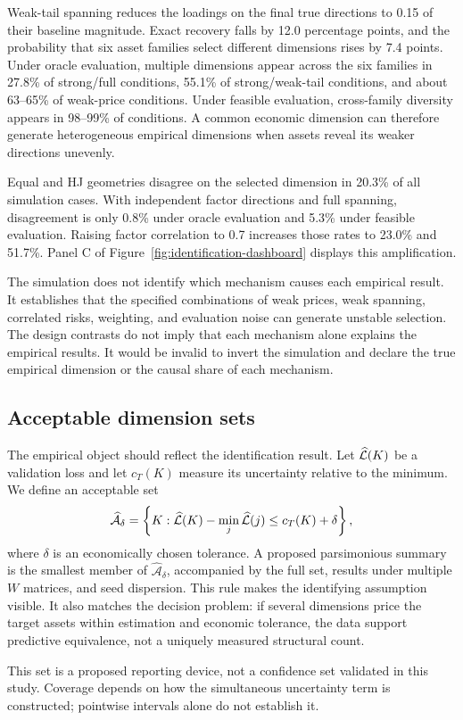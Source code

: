 Weak-tail spanning reduces the loadings on the final true directions to 0.15 of their baseline magnitude. Exact recovery falls by 12.0 percentage points, and the probability that six asset families select different dimensions rises by 7.4 points. Under oracle evaluation, multiple dimensions appear across the six families in 27.8\% of strong/full conditions, 55.1\% of strong/weak-tail conditions, and about 63--65\% of weak-price conditions. Under feasible evaluation, cross-family diversity appears in 98--99\% of conditions. A common economic dimension can therefore generate heterogeneous empirical dimensions when assets reveal its weaker directions unevenly.

Equal and HJ geometries disagree on the selected dimension in 20.3\% of all simulation cases. With independent factor directions and full spanning, disagreement is only 0.8\% under oracle evaluation and 5.3\% under feasible evaluation. Raising factor correlation to 0.7 increases those rates to 23.0\% and 51.7\%. Panel C of Figure~\ref{fig:identification-dashboard} displays this amplification.

The simulation does not identify which mechanism causes each empirical result. It establishes that the specified combinations of weak prices, weak spanning, correlated risks, weighting, and evaluation noise can generate unstable selection. The design contrasts do not imply that each mechanism alone explains the empirical results. It would be invalid to invert the simulation and declare the true empirical dimension or the causal share of each mechanism.

\subsection{Acceptable dimension sets}

The empirical object should reflect the identification result. Let $\widehat {\mathcal{L}}(K)$ be a validation loss and let $c_T(K)$ measure its uncertainty relative to the minimum. We define an acceptable set
\begin{equation}
 \widehat{\mathcal A}_{\delta}=\left\{K:\widehat{\mathcal{L}}(K)-\min_j\widehat{\mathcal{L}}(j)\leq c_T(K)+\delta\right\},
\end{equation}
where $\delta$ is an economically chosen tolerance. A proposed parsimonious summary is the smallest member of $\widehat{\mathcal A}_{\delta}$, accompanied by the full set, results under multiple $W$ matrices, and seed dispersion. This rule makes the identifying assumption visible. It also matches the decision problem: if several dimensions price the target assets within estimation and economic tolerance, the data support predictive equivalence, not a uniquely measured structural count.

This set is a proposed reporting device, not a confidence set validated in this study. Coverage depends on how the simultaneous uncertainty term is constructed; pointwise intervals alone do not establish it.
